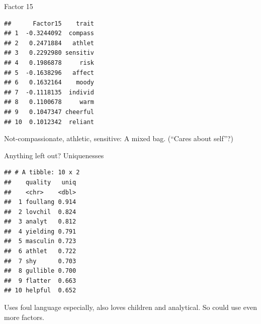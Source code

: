 \documentclass[ignorenonframetext,]{beamer}
\newenvironment{Shaded}{\begin{snugshade}}{\end{snugshade}}
\newcommand{\DataTypeTok}[1]{\textcolor[rgb]{0.13,0.29,0.53}{#1}}
\newcommand{\DecValTok}[1]{\textcolor[rgb]{0.00,0.00,0.81}{#1}}
\newcommand{\FloatTok}[1]{\textcolor[rgb]{0.00,0.00,0.81}{#1}}
\newcommand{\KeywordTok}[1]{\textcolor[rgb]{0.13,0.29,0.53}{\textbf{#1}}}
\newcommand{\NormalTok}[1]{#1}
\newcommand{\OperatorTok}[1]{\textcolor[rgb]{0.81,0.36,0.00}{\textbf{#1}}}
\newcommand{\StringTok}[1]{\textcolor[rgb]{0.31,0.60,0.02}{#1}}
\begin{document}
\begin{frame}[fragile]{Factor 15}
\protect\hypertarget{factor-15}{}

\footnotesize

\begin{Shaded}
\end{Shaded}

\begin{verbatim}
##      Factor15    trait
## 1  -0.3244092  compass
## 2   0.2471884   athlet
## 3   0.2292980 sensitiv
## 4   0.1986878     risk
## 5  -0.1638296   affect
## 6   0.1632164    moody
## 7  -0.1118135  individ
## 8   0.1100678     warm
## 9   0.1047347 cheerful
## 10  0.1012342  reliant
\end{verbatim}

\normalsize

Not-compassionate, athletic, sensitive: A mixed bag. (``Cares about
self''?)

\end{frame}

\begin{frame}[fragile]{Anything left out? Uniquenesses}
\protect\hypertarget{anything-left-out-uniquenesses}{}

\scriptsize

\begin{Shaded}
\end{Shaded}

\begin{verbatim}
## # A tibble: 10 x 2
##    quality   uniq
##    <chr>    <dbl>
##  1 foullang 0.914
##  2 lovchil  0.824
##  3 analyt   0.812
##  4 yielding 0.791
##  5 masculin 0.723
##  6 athlet   0.722
##  7 shy      0.703
##  8 gullible 0.700
##  9 flatter  0.663
## 10 helpful  0.652
\end{verbatim}

\normalsize

Uses foul language especially, also loves children and analytical. So
could use even more factors.

\end{frame}
\end{document}

